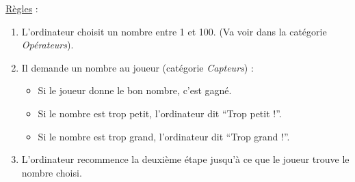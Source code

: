 \documentclass[a4paper,12pt]{article}
\begin{document}
\uline{Règles} :
\begin{enumerate}
	\item L'ordinateur choisit un nombre entre 1 et 100. (Va voir dans la catégorie \textit{Opérateurs}).
	\item Il demande un nombre au joueur (catégorie \textit{Capteurs}) :
	      \begin{itemize}
		      \item Si le joueur donne le bon nombre, c'est gagné.
		      \item Si le nombre est trop petit, l'ordinateur dit “Trop petit !”.
		      \item Si le nombre est trop grand, l'ordinateur dit “Trop grand !”.
	      \end{itemize}
	\item L'ordinateur recommence la deuxième étape jusqu'à ce que le joueur trouve le nombre choisi.
\end{enumerate}
\end{document}
